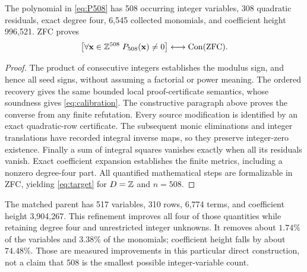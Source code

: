 \begin{theorem}
The polynomial in \eqref{eq:P508} has 508 occurring integer variables,
308 quadratic residuals, exact degree four, 6,545 collected monomials, and
coefficient height 996,521. ZFC proves
\[
 \bigl[\forall\mathbf x\in\mathbb Z^{508}\;P_{508}(\mathbf x)\ne0\bigr]
 \longleftrightarrow\operatorname{Con}(\mathrm{ZFC}).
\]
\end{theorem}
\begin{proof}
The product of consecutive integers establishes the modulus sign, and hence
all seed signs, without assuming a factorial or power meaning. The ordered recovery gives the
same bounded local proof-certificate semantics, whose soundness gives
\eqref{eq:calibration}. The constructive paragraph above proves the
converse from any finite refutation. Every source modification is
identified by an exact quadratic-row certificate. The subsequent monic
eliminations and integer translations have recorded integral inverse maps,
so they preserve integer-zero existence. Finally a sum of integral squares
vanishes exactly when all its residuals vanish. Exact coefficient expansion
establishes the finite metrics, including a nonzero degree-four part.
All quantified mathematical steps are formalizable in ZFC, yielding
\eqref{eq:target} for $D=\mathbb Z$ and $n=508$.
\end{proof}

The matched parent has 517 variables, 310 rows, 6,774 terms, and coefficient
height 3,904,267. This refinement improves all four of those quantities
while retaining degree four and unrestricted integer unknowns. It removes
about $1.74\%$ of the variables and $3.38\%$ of the monomials; coefficient
height falls by about $74.48\%$. Those are measured improvements in this
particular direct construction, not a claim that 508 is the smallest
possible integer-variable count.
